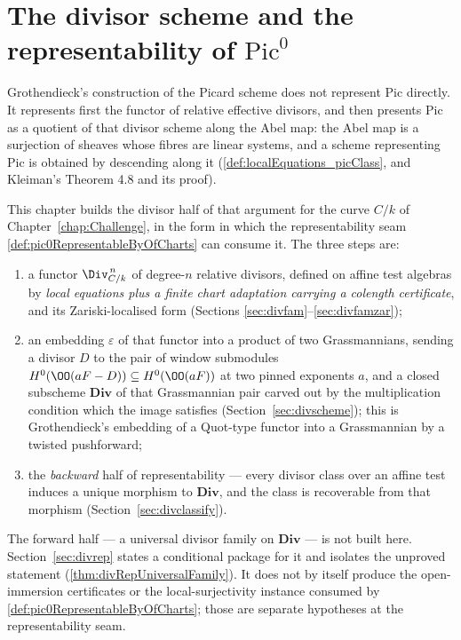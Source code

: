 \chapter{The divisor scheme and the representability of \(\mathrm{Pic}^0\)}
\label{chap:DivisorScheme}

Grothendieck's construction of the Picard scheme does not represent \(\mathrm{Pic}\)
directly. It represents first the functor of relative effective divisors, and then
presents \(\mathrm{Pic}\) as a quotient of that divisor scheme along the Abel map: the
Abel map is a surjection of sheaves whose fibres are linear systems, and a scheme
representing \(\mathrm{Pic}\) is obtained by descending along it
(\ref{def:localEquations_picClass}, and Kleiman's Theorem 4.8 and its proof).

This chapter builds the divisor half of that argument for the curve \(C/k\) of
Chapter~\ref{chap:Challenge}, in the form in which the representability seam
\ref{def:pic0RepresentableByOfCharts} can consume it. The three steps are:

\begin{enumerate}
  \item a functor \(\Div^{\,n}_{C/k}\) of degree-\(n\) relative divisors, defined on affine
    test algebras by \emph{local equations plus a finite chart adaptation carrying a
    colength certificate}, and its Zariski-localised form (Sections
    \ref{sec:divfam}--\ref{sec:divfamzar});
  \item an embedding \(\varepsilon\) of that functor into a product of two Grassmannians,
    sending a divisor \(D\) to the pair of window submodules
    \(H^0(\OO(aF - D)) \subseteq H^0(\OO(aF))\) at two pinned exponents \(a\), and a closed
    subscheme \(\mathbf{Div}\) of that Grassmannian pair carved out by the multiplication
    condition which the image satisfies (Section~\ref{sec:divscheme}); this is
    Grothendieck's embedding of a Quot-type functor into a Grassmannian by a twisted
    pushforward;
  \item the \emph{backward} half of representability --- every divisor class over an affine
    test induces a unique morphism to \(\mathbf{Div}\), and the class is recoverable from
    that morphism (Section~\ref{sec:divclassify}).
\end{enumerate}

The forward half --- a universal divisor family on \(\mathbf{Div}\) --- is not built here.
Section~\ref{sec:divrep} states a conditional package for it and isolates the unproved
statement (\ref{thm:divRepUniversalFamily}).  It does not by itself produce the
open-immersion certificates or the local-surjectivity instance consumed by
\ref{def:pic0RepresentableByOfCharts}; those are separate hypotheses at the representability
seam.

